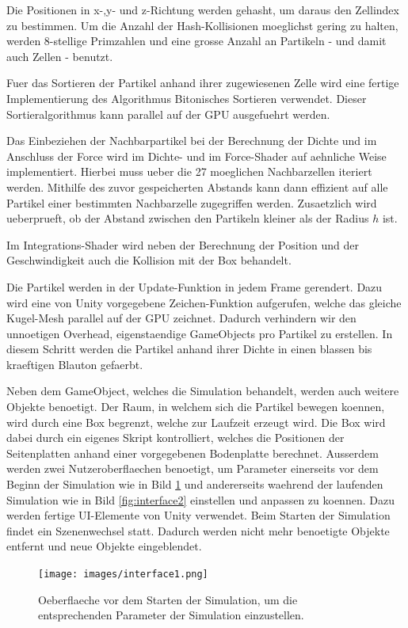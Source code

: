\documentclass[a4paper]{paper}
\begin{document}
Die Positionen in x-,y- und z-Richtung werden gehasht, um daraus den Zellindex zu bestimmen. Um die Anzahl der Hash-Kollisionen moeglichst gering zu halten, werden 8-stellige Primzahlen und eine grosse Anzahl an Partikeln - und damit auch Zellen - benutzt.

Fuer das Sortieren der Partikel anhand ihrer zugewiesenen Zelle wird eine fertige Implementierung des Algorithmus Bitonisches Sortieren verwendet. Dieser Sortieralgorithmus kann parallel auf der GPU ausgefuehrt werden.

Das Einbeziehen der Nachbarpartikel bei der Berechnung der Dichte und im Anschluss der Force wird im Dichte- und im Force-Shader auf aehnliche Weise implementiert. Hierbei muss ueber die 27 moeglichen Nachbarzellen iteriert werden. Mithilfe des zuvor gespeicherten Abstands kann dann effizient auf alle Partikel einer bestimmten Nachbarzelle zugegriffen werden. Zusaetzlich wird ueberprueft, ob der Abstand zwischen den Partikeln kleiner als der Radius $h$ ist.

Im Integrations-Shader wird neben der Berechnung der Position und der Geschwindigkeit auch die Kollision mit der Box behandelt.

Die Partikel werden in der Update-Funktion in jedem Frame gerendert. Dazu wird eine von Unity vorgegebene Zeichen-Funktion aufgerufen, welche das gleiche Kugel-Mesh parallel auf der GPU zeichnet. Dadurch verhindern wir den unnoetigen Overhead, eigenstaendige GameObjects pro Partikel zu erstellen. In diesem Schritt werden die Partikel anhand ihrer Dichte in einen blassen bis kraeftigen Blauton gefaerbt.

Neben dem GameObject, welches die Simulation behandelt, werden auch weitere Objekte benoetigt. Der Raum, in welchem sich die Partikel bewegen koennen, wird durch eine Box begrenzt, welche zur Laufzeit erzeugt wird. Die Box wird dabei durch ein eigenes Skript kontrolliert, welches die Positionen der Seitenplatten anhand einer vorgegebenen Bodenplatte berechnet.
Ausserdem werden zwei Nutzeroberflaechen benoetigt, um Parameter einerseits vor dem Beginn der Simulation wie in Bild \ref{fig:interface1} und andererseits waehrend der laufenden Simulation wie in Bild \ref{fig:interface2} einstellen und anpassen zu koennen. Dazu werden fertige UI-Elemente von Unity verwendet. Beim Starten der Simulation findet ein Szenenwechsel statt. Dadurch werden nicht mehr benoetigte Objekte entfernt und neue Objekte eingeblendet.

\begin{figure}[t]
    \centering
    \texttt{[image: images/interface1.png]}
    \caption{Oeberflaeche vor dem Starten der Simulation, um die entsprechenden Parameter der Simulation einzustellen.}
    \label{fig:interface1}
\end{figure}
\end{document}
